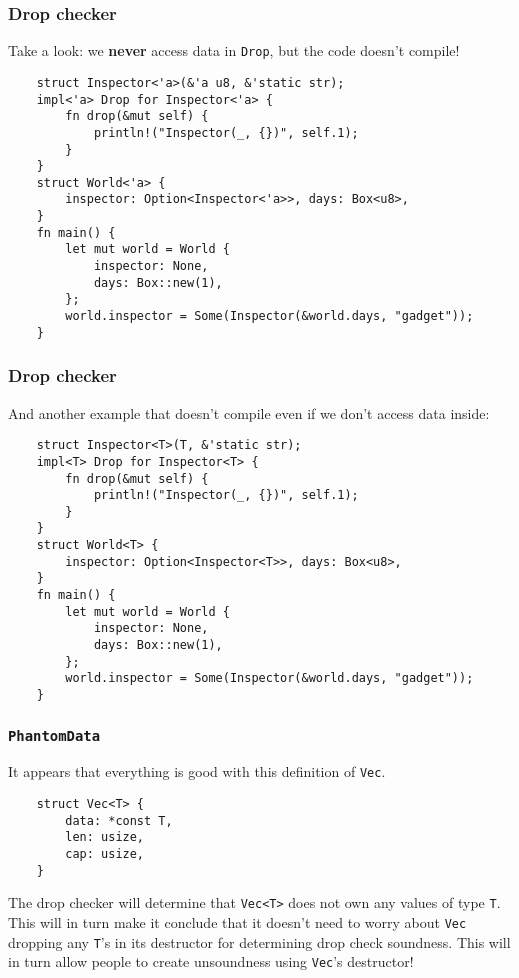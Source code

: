 \documentclass[aspectratio=1610,t]{beamer}
\begin{document}

\begin{frame}[fragile,c]
\frametitle{Drop checker}
Take a look: we \textbf{never} access data in \texttt{Drop}, but the code doesn't compile!

\begin{verbatim}
    struct Inspector<'a>(&'a u8, &'static str);
    impl<'a> Drop for Inspector<'a> {
        fn drop(&mut self) {
            println!("Inspector(_, {})", self.1);
        }
    }
    struct World<'a> {
        inspector: Option<Inspector<'a>>, days: Box<u8>,
    }
    fn main() {
        let mut world = World {
            inspector: None,
            days: Box::new(1),
        };
        world.inspector = Some(Inspector(&world.days, "gadget"));
    }
\end{verbatim}
\end{frame}


\begin{frame}[fragile,c]
\frametitle{Drop checker}
And another example that doesn't compile even if we don't access data inside:

\begin{verbatim}
    struct Inspector<T>(T, &'static str);
    impl<T> Drop for Inspector<T> {
        fn drop(&mut self) {
            println!("Inspector(_, {})", self.1);
        }
    }
    struct World<T> {
        inspector: Option<Inspector<T>>, days: Box<u8>,
    }
    fn main() {
        let mut world = World {
            inspector: None,
            days: Box::new(1),
        };
        world.inspector = Some(Inspector(&world.days, "gadget"));
    }
\end{verbatim}
\end{frame}


\begin{frame}[fragile]
\frametitle{\texttt{PhantomData}}
It appears that everything is good with this definition of \texttt{Vec}.

\begin{verbatim}
    struct Vec<T> {
        data: *const T,
        len: usize,
        cap: usize,
    }
\end{verbatim}

The drop checker will determine that \texttt{Vec<T>} does not own any values of type \texttt{T}. This will in turn make it conclude that it doesn't need to worry about \texttt{Vec} dropping any \texttt{T}'s in its destructor for determining drop check soundness. This will in turn allow people to create unsoundness using \texttt{Vec}'s destructor!
\end{frame}
\end{document}
